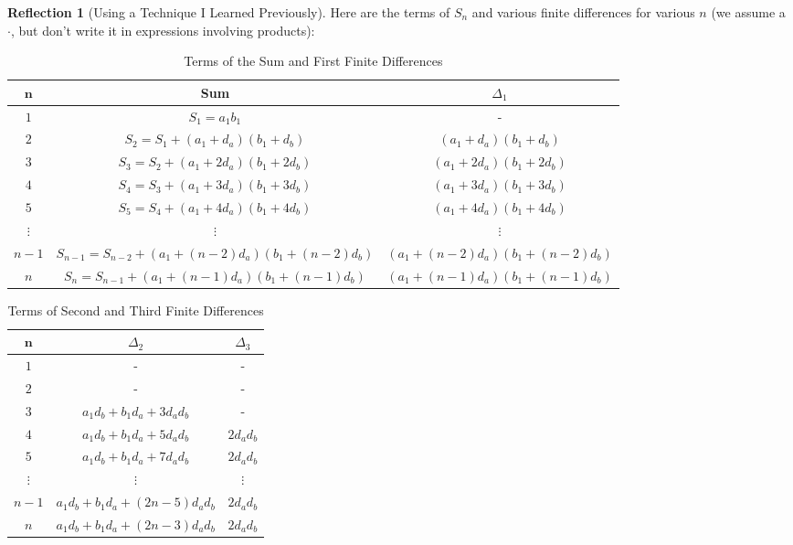\documentclass[11pt]{book}
\theoremstyle{definition}
\theoremstyle{plain}
\theoremstyle{definition}
\theoremstyle{problemstyle}
\theoremstyle{remark}
\theoremstyle{definition}
\newtheorem{reflection}{Reflection}
\begin{document}
\begin{reflection}[Using a Technique I Learned Previously]
    Here are the terms of $S_n$ and various finite differences for various $n$ (we assume a $\cdot$, but don't write it in expressions involving products):
\begin{table}[H] 
\centering
\begin{tabular}{|c|c|c|}
 \hline
    $\boldsymbol{n}$&Sum&$\Delta_1$\\ \hline
    \hline
    $1$&$S_1=a_1 b_1$&-\\\hline
    $2$&$S_2=S_1+(a_1+d_a)(b_1+d_b)$&$(a_1+d_a)(b_1+d_b)$\\\hline
    $3$&$S_3=S_2+(a_1+2d_a)(b_1+2d_b)$&$(a_1+2d_a)(b_1+2d_b)$\\\hline
    $4$&$S_4=S_3+(a_1+3d_a)(b_1+3d_b)$&$(a_1+3d_a)(b_1+3d_b)$\\\hline
    $5$&$S_5=S_4+(a_1+4d_a)(b_1+4d_b)$&$(a_1+4d_a)(b_1+4d_b)$\\\hline
    $\vdots$&$\vdots$&$\vdots$\\\hline
    ${\scriptstyle n-1}$&${\scriptstyle S_{n-1}=S_{n-2}+(a_1+(n-2)d_a)(b_1+(n-2)d_b)}$&${\scriptstyle (a_1+(n-2)d_a)(b_1+(n-2)d_b)}$\\\hline
    ${\scriptstyle n}$&${\scriptstyle S_n=S_{n-1}+(a_1+(n-1)d_a)(b_1+(n-1)d_b)}$&${\scriptstyle (a_1+(n-1)d_a)(b_1+(n-1)d_b)}$\\\hline
\end{tabular}
    \caption{Terms of the Sum and First Finite Differences}
    \label{tab:a1b1+a2b2+...1}
\end{table}

\begin{table}[H] 
\centering
\begin{tabular}{|c|c|c|}
 \hline
    $\boldsymbol{n}$&$\Delta_2$&$\Delta_3$\\ \hline
    \hline
    $1$&-&-\\\hline
    $2$&-&-\\\hline
    $3$&$a_1d_b+b_1d_a+3d_ad_b$&-\\\hline
    $4$&$a_1d_b+b_1d_a+5d_ad_b$&$2d_ad_b$\\\hline
    $5$&$a_1d_b+b_1d_a+7d_ad_b$&$2d_ad_b$\\\hline
    $\vdots$&$\vdots$&$\vdots$\\\hline
    $n-1$&$a_1d_b+b_1d_a+(2n-5)d_ad_b$&$2d_ad_b$\\\hline
    $n$&$a_1d_b+b_1d_a+(2n-3)d_ad_b$&$2d_ad_b$\\\hline
\end{tabular}
    \caption{Terms of Second and Third Finite Differences}
    \label{tab:a1b1+a2b2+...2}
\end{table}


\end{reflection}
\end{document}
